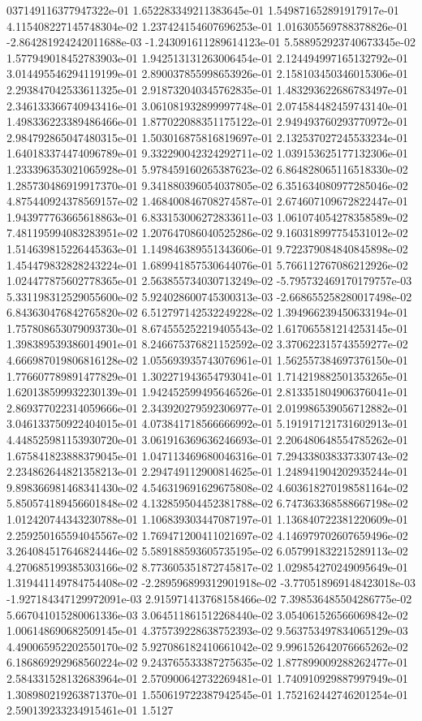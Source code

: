 037149116377947322e-01	1.652283349211383645e-01	1.549871652891917917e-01	4.115408227145748304e-02	1.237424154607696253e-01	1.016305569788378826e-01	-2.864281924242011688e-03	-1.243091611289614123e-01	5.588952923740673345e-02	1.577949018452783903e-01	1.942513131263006454e-01	2.124494997165132792e-01	3.014495546294119199e-01	2.890037855998653926e-01	2.158103450346015306e-01	2.293847042533611325e-01	2.918732040345762835e-01	1.483293622686783497e-01	2.346133366740943416e-01	3.061081932899997748e-01	2.074584482459743140e-01	1.498336223389486466e-01	1.877022088351175122e-01	2.949493760293770972e-01	2.984792865047480315e-01	1.503016875816819697e-01	2.132537027245533234e-01	1.640183374474096789e-01	9.332290042324292711e-02	1.039153625177132306e-01	1.233396353021065928e-01	5.978459160265387623e-02	6.864828065116518330e-02	1.285730486919917370e-01	9.341880396054037805e-02	6.351634080977285046e-02	4.875440924378569157e-02	1.468400846708274587e-01	2.674607109672822447e-01	1.943977763665618863e-01	6.833153006272833611e-03	1.061074054278358589e-02	7.481195994083283951e-02	1.207647086040525286e-02	9.160318997754531012e-02	1.514639815226445363e-01	1.149846389551343606e-01	9.722379084840845898e-02	1.454479832828243224e-01	1.689941857530644076e-01	5.766112767086212926e-02	1.024477875602778365e-01	2.563855734030713249e-02	-5.795732469170179757e-03	5.331198312529055600e-02	5.924028600745300313e-03	-2.668655258280017498e-02	6.843630476842765820e-02	6.512797142532249228e-02	1.394966239450633194e-01	1.757808653079093730e-01	8.674555252219405543e-02	1.617065581214253145e-01	1.398389539386014901e-01	8.246675376821152592e-02	3.370622315743559277e-02	4.666987019806816128e-02	1.055693935743076961e-01	1.562557384697376150e-01	1.776607789891477829e-01	1.302271943654793041e-01	1.714219882501353265e-01	1.620138599932230139e-01	1.942452599495646526e-01	2.813351804906376041e-01	2.869377022314059666e-01	2.343920279592306977e-01	2.019986539056712882e-01	3.046133750922404015e-01	4.073841718566666992e-01	5.191917121731602913e-01	4.448525981153930720e-01	3.061916369636246693e-01	2.206480648554785262e-01	1.675841823888379045e-01	1.047113469680046316e-01	7.294338038337330743e-02	2.234862644821358213e-01	2.294749112900814625e-01	1.248941904202935244e-01	9.898366981468341430e-02	4.546319691629675808e-02	4.603618270198581164e-02	5.850574189456601848e-02	4.132859504452381788e-02	6.747363368588667198e-02	1.012420744343230788e-01	1.106839303447087197e-01	1.136840722381220609e-01	2.259250165594045567e-02	1.769471200411021697e-02	4.146979702607659496e-02	3.264084517646824446e-02	5.589188593605735195e-02	6.057991832215289113e-02	4.270685199385303166e-02	8.773605351872745817e-02	1.029854270249095649e-01	1.319441149784754408e-02	-2.289596899312901918e-02	-3.770518969148423018e-03	-1.927184347129972091e-03	2.915971413768158466e-02	7.398536485504286775e-02	5.667041015280061336e-03	3.064511861512268440e-02	3.054061526566069842e-02	1.006148690682509145e-01	4.375739228638752393e-02	9.563753497834065129e-03	4.490065952202550170e-02	5.927086182410661042e-02	9.996152642076665262e-02	6.186869292968560224e-02	9.243765533387275635e-02	1.877899009288262477e-01	2.584331528132683964e-01	2.570900642732269481e-01	1.740910929887997949e-01	1.308980219263871370e-01	1.550619722387942545e-01	1.752162442746201254e-01	2.590139233234915461e-01	1.5127